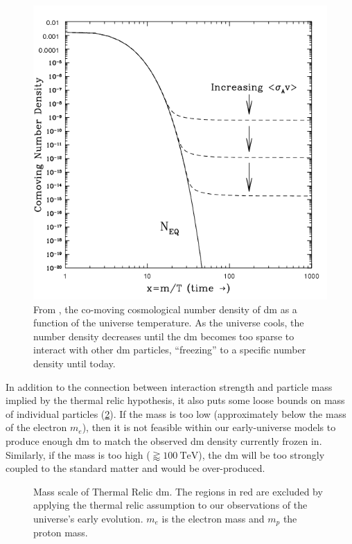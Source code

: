\begin{figure}
  \centering
  \includegraphics[width=\textwidth]{figures/theory/number-density-at-freeze-out.png}
  \caption{
    From \cite{thermal-freezeout-diagram-1996}, the co-moving cosmological number density of \ac{dm} as a function of the universe
    temperature. As the universe cools, the number density decreases until the \ac{dm}
    becomes too sparse to interact with other \ac{dm} particles, ``freezing'' to a specific
    number density until today.
  }
  \label{fig:number-density}
\end{figure}

In addition to the connection between interaction strength and particle mass implied by the thermal
relic hypothesis, it also puts some loose bounds on mass of individual particles
(\cref{fig:dm-mass-scale}). If the mass is too low (approximately below the mass of the electron
$m_e$), then it is not feasible within our early-universe models to produce enough \ac{dm} to match
the observed \ac{dm} density currently frozen in. Similarly, if the mass is too high ($\gtrapprox
  100~\text{TeV}$), the \ac{dm} will be too strongly coupled to the standard matter and would be
over-produced.

\begin{figure}
  \centering
  
  \caption{Mass scale of Thermal Relic \ac{dm}.
  The regions in red are excluded by applying the thermal relic assumption
  to our observations of the universe's early evolution.
  $m_e$ is the electron mass and $m_p$ the proton mass.
  }
  \label{fig:dm-mass-scale}
\end{figure}

